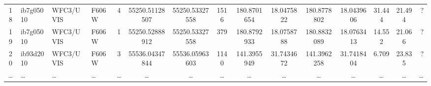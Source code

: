 \documentclass{aa}
\begin{document}
\begin{appendix}
\begin{landscape}
\begin{table}
\begin{tabular}{c l l l c c c c c c c c c c r}
18 & ib7g05010 & WFC3/UVIS & F606W & 4 & 55250.51128507 & 55250.53327558 & 1516 & 180.8701654 & 18.0475822 & 180.8778802 & 18.0439606 & 31.444 & 21.494 &  ? \\
19 & ib7g05010 & WFC3/UVIS & F606W & 1 & 55250.52888912 & 55250.53327558 & 379 & 180.8792933 & 18.0758788 & 180.8832089 & 18.0763413 & 14.552 & 21.066 &  ? \\
20 & ib93d2010 & WFC3/UVIS & F606W & 3 & 55536.04347844 & 55536.05963603 & 1140 & 141.3955949 & 31.7434672 & 141.3962258 & 31.7418404 & 6.709 & 23.835 &  ? \\
… & … & … & … & … & … & … & … & … & … & … & … & … & … & … \\

\hline
\end{tabular}
\end{table}
\end{landscape}

\end{appendix}
\end{document}
